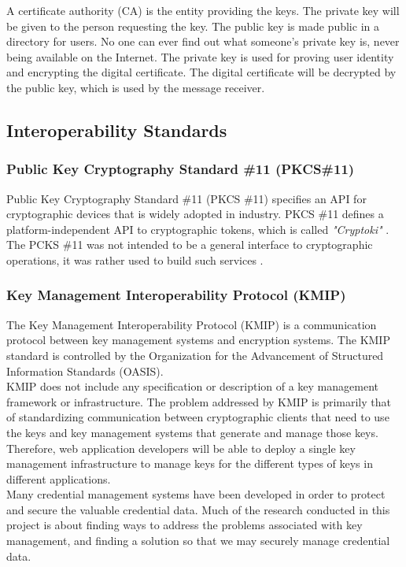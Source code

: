 \documentclass[11pt, a4paper, notitlepage]{article}
\begin{document}
A certificate authority (CA) is the entity providing the keys. The private key will be given to the person requesting the key. The public key is made public in a directory for users. No one can ever find out what someone’s private key is, never being available on the Internet. The private key is used for proving user identity and encrypting the digital certificate. The digital certificate will be decrypted by the public key, which is used by the message receiver. \cite{PKI:Online}


\subsection*{Interoperability Standards}
\subsubsection*{Public Key Cryptography Standard \#11 (PKCS\#11)}
Public Key Cryptography Standard \#11  (PKCS \#11) specifies an API for cryptographic devices that is widely adopted in industry. PKCS \#11 defines a platform-independent API to cryptographic tokens, which is called \emph{"Cryptoki"} \cite{bortolozzo2010attacking}. The PCKS \#11 was not intended to be a general interface to cryptographic operations, it was rather used to build such services \cite{p}.

\subsubsection*{Key Management Interoperability Protocol (KMIP)}
The Key Management Interoperability Protocol (KMIP) is a communication protocol between key management systems and encryption systems. The KMIP standard is controlled by the Organization for the Advancement of Structured Information Standards (OASIS). \\

KMIP does not include any specification or description of a key management framework or infrastructure. The problem addressed by KMIP is primarily that of standardizing communication between cryptographic clients that need to use the keys and key management systems that generate and manage those keys. Therefore, web application developers will be able to deploy a single key management infrastructure to manage keys for the different types of keys in different applications. \\


Many credential management systems have been developed in order to protect and secure the valuable credential data. Much of the research conducted in this project is about finding ways to address the problems associated with key management, and finding a solution so that we may securely manage credential data. \\
\end{document}
